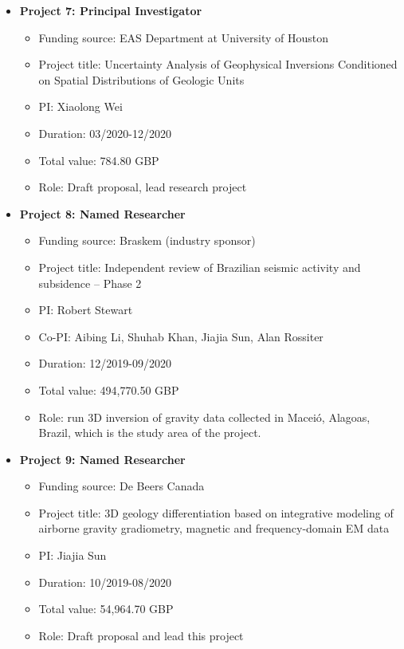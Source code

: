 \documentclass[11pt, a4paper]{article}
\begin{document}
\begin{itemize}
	\item{\textbf{Project 7: Principal Investigator}}
	\begin{itemize}
	\item Funding source: EAS Department at University of Houston
	\item Project title: Uncertainty Analysis of Geophysical Inversions Conditioned on Spatial Distributions of Geologic Units
	\item PI: Xiaolong Wei
	\item Duration: 03/2020-12/2020
	\item Total value: 784.80 GBP
	\item Role: Draft proposal, lead research project
	\end{itemize}
	
	\item{\textbf{Project 8: Named Researcher}}
	\begin{itemize}
	\item Funding source: Braskem (industry sponsor)
	\item Project title: Independent review of Brazilian seismic activity and subsidence – Phase 2
	\item PI: Robert Stewart
	\item Co-PI: Aibing Li, Shuhab Khan, Jiajia Sun, Alan Rossiter
	\item Duration: 12/2019-09/2020
	\item Total value: 494,770.50 GBP
	\item Role: run 3D inversion of gravity data collected in Maceió, Alagoas, Brazil, which is the study area of the project.
	\end{itemize}
	
	\item{\textbf{Project 9: Named Researcher}}
	\begin{itemize}
	\item Funding source: De Beers Canada
	\item Project title: 3D geology differentiation based on integrative modeling of airborne gravity gradiometry, magnetic and frequency-domain EM data
	\item PI: Jiajia Sun
	\item Duration: 10/2019-08/2020
	\item Total value: 54,964.70 GBP
	\item Role: Draft proposal and lead this project
	\end{itemize}
	
\end{itemize}
\end{document}
